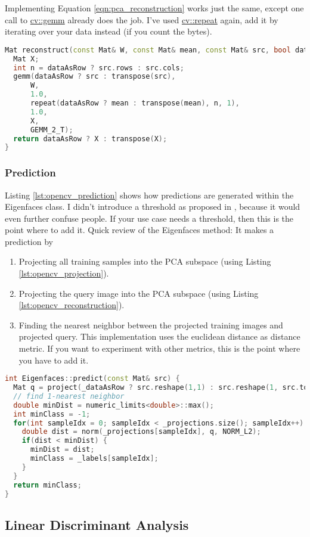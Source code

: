 Implementing Equation \ref{eqn:pca_reconstruction} works just the same, except one call to \href{http://opencv.willowgarage.com/documentation/cpp/core_operations_on_arrays.html#cv-gemm}{cv::gemm} already does the job. I've used \href{http://opencv.willowgarage.com/documentation/cpp/core_operations_on_arrays.html#cv-repeat}{cv::repeat} again, add it by iterating over your data instead (if you count the bytes).

\begin{lstlisting}[language=c++, caption={\lstinline|reconstruct| reconstructs a given coefficient vector from the PCA basis. \label{lst:opencv_reconstruction}}]
Mat reconstruct(const Mat& W, const Mat& mean, const Mat& src, bool dataAsRow) {
  Mat X;
  int n = dataAsRow ? src.rows : src.cols;
  gemm(dataAsRow ? src : transpose(src),
      W,
      1.0,
      repeat(dataAsRow ? mean : transpose(mean), n, 1),
      1.0,
      X,
      GEMM_2_T);
  return dataAsRow ? X : transpose(X);
}
\end{lstlisting}

\subsubsection{Prediction}

Listing \ref{lst:opencv_prediction} shows how predictions are generated within the Eigenfaces class. I didn't introduce a threshold as proposed in \cite{PT91}, because it would even further confuse people. If your use case needs a threshold, then this is the point where to add it. Quick review of the Eigenfaces method: It makes a prediction by 

\begin{enumerate}
	\item Projecting all training samples into the PCA subspace (using Listing \ref{lst:opencv_projection}).
	\item Projecting the query image into the PCA subspace (using Listing \ref{lst:opencv_reconstruction}).
	\item Finding the nearest neighbor between the projected training images and projected query. This implementation uses the euclidean distance as distance metric. If you want to experiment with other metrics, this is the point where you have to add it.
\end{enumerate}

\begin{lstlisting}[language=c++, caption={\lstinline|Eigenfaces::predict| gets a prediction for a given query image. \label{lst:opencv_prediction}}]
int Eigenfaces::predict(const Mat& src) {
  Mat q = project(_dataAsRow ? src.reshape(1,1) : src.reshape(1, src.total()));
  // find 1-nearest neighbor
  double minDist = numeric_limits<double>::max();
  int minClass = -1;
  for(int sampleIdx = 0; sampleIdx < _projections.size(); sampleIdx++) {
    double dist = norm(_projections[sampleIdx], q, NORM_L2);
    if(dist < minDist) {
      minDist = dist;
      minClass = _labels[sampleIdx];
    }
  }
  return minClass;
}
\end{lstlisting}

\subsection{Linear Discriminant Analysis}




